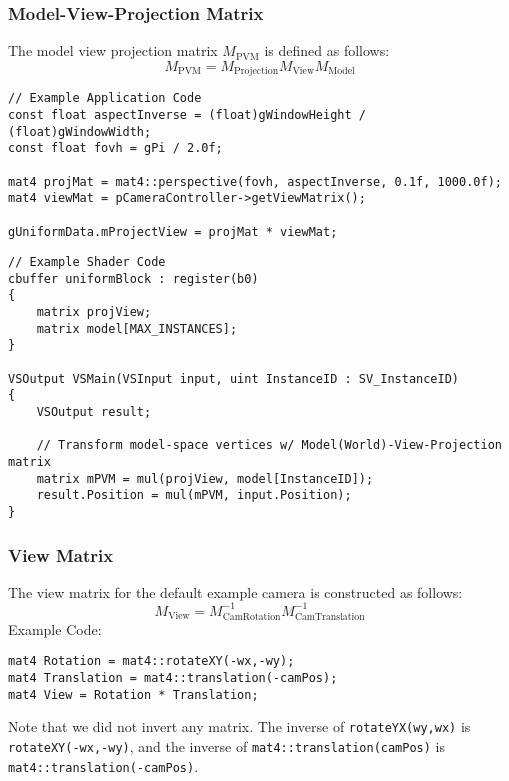 \documentclass{article}
\newcommand{\MatSubText}[2]{#1_\text{#2}}
\let\lstInline\lstinline %
\newcommand{\InlCode}[1]{\lstInline[basicstyle=\ttfamily]{#1}}
\begin{document}
\subsubsection{Model-View-Projection Matrix}
The model view projection matrix $\MatSubText{M}{PVM}$ is defined as follows:
\begin{equation*}
\MatSubText{M}{PVM} = \MatSubText{M}{Projection}\MatSubText{M}{View}\MatSubText{M}{Model}
\end{equation*}

\begin{lstlisting}	
// Example Application Code
const float aspectInverse = (float)gWindowHeight / (float)gWindowWidth;
const float fovh = gPi / 2.0f;

mat4 projMat = mat4::perspective(fovh, aspectInverse, 0.1f, 1000.0f);
mat4 viewMat = pCameraController->getViewMatrix();

gUniformData.mProjectView = projMat * viewMat;
\end{lstlisting}

\begin{lstlisting}	
// Example Shader Code
cbuffer uniformBlock : register(b0)
{
	matrix projView;
	matrix model[MAX_INSTANCES];
}

VSOutput VSMain(VSInput input, uint InstanceID : SV_InstanceID)
{
	VSOutput result;

	// Transform model-space vertices w/ Model(World)-View-Projection matrix
	matrix mPVM = mul(projView, model[InstanceID]);
	result.Position = mul(mPVM, input.Position);
}
\end{lstlisting}

\subsubsection{View Matrix}
The view matrix for the default example camera is constructed as follows:
\begin{equation*}
\MatSubText{M}{View} = \MatSubText{M}{CamRotation}^{-1}\MatSubText{M}{CamTranslation}^{-1}
\end{equation*}
Example Code:
\begin{lstlisting}
mat4 Rotation = mat4::rotateXY(-wx,-wy);
mat4 Translation = mat4::translation(-camPos);
mat4 View = Rotation * Translation;
\end{lstlisting}
Note that we did not invert any matrix. The inverse of \InlCode{rotateYX(wy,wx)} is \InlCode{rotateXY(-wx,-wy)}, and the inverse of \InlCode{mat4::translation(camPos)} is \InlCode{mat4::translation(-camPos)}.
\end{document}
